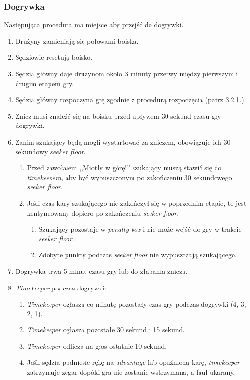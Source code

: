 \documentclass[11pt,a4paper]{article}
\begin{document}
\subsubsection{Dogrywka}
Następująca procedura ma miejsce aby przejść do dogrywki.
\begin{enumerate}
  \item Drużyny zamieniają się połowami boiska.
  \item Sędziowie resetują boisko.
  \item Sędzia główny daje drużynom około 3 minuty przerwy między pierwszym i drugim etapem gry.
  \item Sędzia główny rozpoczyna grę zgodnie z procedurą rozpoczęcia (patrz 3.2.1.) %
  \item Znicz musi znaleźć się na boisku przed upływem 30 sekund czasu gry dogrywki.
  \item Zanim szukający będą mogli wystartować za zniczem, obowiązuje ich 30 sekundowy \emph{seeker floor}.
  \begin{enumerate}
    \item Przed zawołaiem ,,Miotły w górę!'' szukający muszą stawić się do \emph{timekeepera}, aby być wypuszczonym po zakończeniu 30 sekundowego \emph{seeker floor}.
    \item Jeśli czas kary szukającego nie zakończył się w poprzednim etapie, to jest kontynuowany dopiero po zakończeniu \emph{seeker floor}.
    \begin{enumerate}
      \item Szukający pozostaje w \emph{penalty box} i nie może wejść do gry w trakcie \emph{seeker floor}.
      \item Zdobyte punkty podczas \emph{seeker floor} nie wypuszczają szukającego.
    \end{enumerate}
  \end{enumerate}
  \item Dogrywka trwa 5 minut czasu gry lub do złapania znicza.
  \item \emph{Timekeeper} podczas dogrywki:
  \begin{enumerate}
    \item \emph{Timekeeper} ogłasza co minutę pozostały czas gry podczas dogrywki (4, 3, 2, 1).
    \item \emph{Timekeeper} ogłasza pozostałe 30 sekund i 15 sekund.
    \item \emph{Timekeeper} odlicza na głos ostatnie 10 sekund.
    \item Jeśli sędzia podniesie rękę na \emph{advantage} lub opuźnioną karę, \emph{timekeeper} zatrzymuje zegar dopóki gra nie zostanie wstrzymana, a faul ukarany.
  \end{enumerate}
\end{enumerate}
\end{document}
